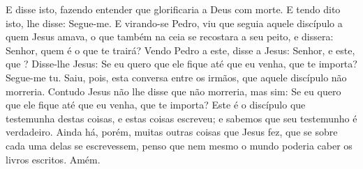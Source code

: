 {  E disse isto, fazendo entender que
{} glorificaria a Deus com
{} morte. E tendo dito isto,
{} lhe disse: Segue-me.
  E virando-se Pedro, viu que
{} seguia aquele discípulo a quem Jesus amava, o que também na ceia se recostara a seu peito, e dissera: Senhor, quem é o que te trairá?
  Vendo Pedro a este, disse a Jesus: Senhor, e este, que
{} ?
  Disse-lhe Jesus: Se eu quero que ele fique até que eu venha, que te importa? Segue-me tu.
  Saiu, pois, esta conversa entre os irmãos, que aquele discípulo não morreria. Contudo Jesus não lhe disse que não morreria, mas sim: Se eu quero que ele fique até que eu venha, que te importa?
  Este é o discípulo que testemunha destas coisas, e estas coisas escreveu; e sabemos que seu testemunho é verdadeiro.
  Ainda há, porém, muitas outras coisas que Jesus fez, que se sobre cada uma delas se escrevessem, penso que nem mesmo o mundo poderia caber os livros escritos. Amém.\par }


